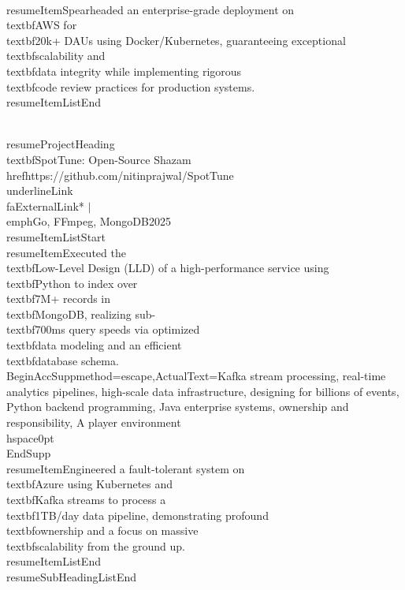 \documentclass[a4paper]{extarticle}
\makeatletter
\renewcommand\normalsize{\fontsize{9}{11}\selectfont}
\newcommand{\resumeItem}[1]{
  \item\normalsize{
    {#1 \vspace{-2pt}}
  }
}
\newcommand{\resumeProjectHeading}[2]{
    \item
    \begin{tabular*}{0.97\textwidth}{l@{\extracolsep{\fill}}r}
      \small#1 & \textbf{\small #2}\
    \end{tabular*}\vspace{-7pt}
}
\newcommand{\resumeSubHeadingListEnd}{\end{itemize}}
\newcommand{\resumeItemListStart}{\begin{itemize}}
\newcommand{\resumeItemListEnd}{\end{itemize}\vspace{-8pt}}
\makeatother
\begin{document}
{{{{{{{{{{        \\resumeItem{Spearheaded an enterprise-grade deployment on \\textbf{AWS} for \\textbf{20k+} DAUs using Docker/Kubernetes, guaranteeing exceptional \\textbf{scalability} and \\textbf{data integrity} while implementing rigorous \\textbf{code review} practices for production systems.}
    \\resumeItemListEnd
   
    \\resumeProjectHeading
    {\\textbf{SpotTune: Open-Source Shazam} {\\href{https://github.com/nitinprajwal/SpotTune}{\\underline{Link \\faExternalLink*}}} $|$ \\emph{Go, FFmpeg, MongoDB}}{2025}
    \\resumeItemListStart
        \\resumeItem{Executed the \\textbf{Low-Level Design (LLD)} of a high-performance service using \\textbf{Python} to index over \\textbf{7M+} records in \\textbf{MongoDB}, realizing sub-\\textbf{700ms} query speeds via optimized \\textbf{data modeling} and an efficient \\textbf{database} schema.}
        \\BeginAccSupp{method=escape,ActualText={Kafka stream processing, real-time analytics pipelines, high-scale data infrastructure, designing for billions of events, Python backend programming, Java enterprise systems, ownership and responsibility, A player environment}}\\hspace{0pt}\\EndSupp{}
        \\resumeItem{Engineered a fault-tolerant system on \\textbf{Azure} using Kubernetes and \\textbf{Kafka} streams to process a \\textbf{1TB/day} data pipeline, demonstrating profound \\textbf{ownership} and a focus on massive \\textbf{scalability} from the ground up.}
    \\resumeItemListEnd
\\resumeSubHeadingListEnd

}}}}}}}}}}
\end{document}
